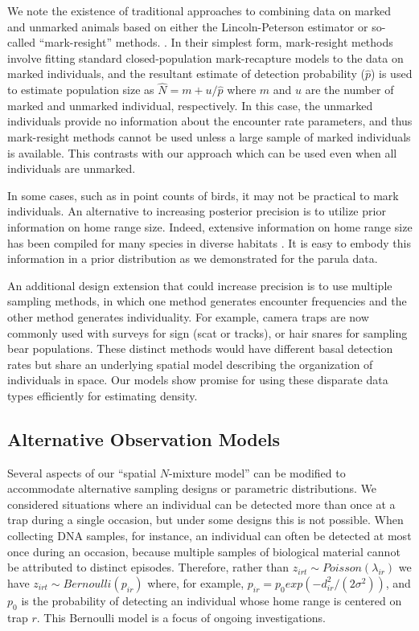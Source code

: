 We note the existence of traditional approaches to combining data on
marked and unmarked animals based on either the Lincoln-Peterson
estimator or so-called ``mark-resight'' methods.
\citep{bartmann_etal:1987, minta_mangel:1989, mcclintock_hoeting:2009}. In their
simplest form, mark-resight methods involve fitting standard
closed-population mark-recapture models to the data on marked
individuals, and the resultant estimate of detection probability
($\hat{p}$) is used to estimate population size as $\hat{N} = m +
u/\hat{p}$ where $m$ and $u$ are the number of
marked and unmarked individual, respectively. In this case,
the unmarked individuals provide no information about the
encounter rate parameters, and thus mark-resight methods cannot be
used unless a large sample of marked individuals is available. This
contrasts with our approach which can be used even when all
individuals are unmarked.

In some cases, such as in point counts of birds, it may not be
practical to mark individuals. An alternative to increasing posterior
precision is to utilize prior information on
home range size. Indeed, extensive information on home range size has
been compiled for many species in diverse habitats %
\citep[\emph{e.g.},][]{degraaf_yamasaki:2001}. It is
easy to embody this information in a prior distribution as we
demonstrated for the parula data.

An additional design extension that could increase precision is to use
multiple sampling methods, in which one method generates encounter
frequencies and the other method generates individuality.
For example, camera traps are now commonly used with surveys for
sign (scat or tracks), or hair snares for sampling bear populations.
These distinct methods would have different basal detection
rates but share an underlying spatial model describing the
organization of individuals in space.
Our models show promise for using
these disparate data types efficiently
for estimating density.




\subsection{Alternative Observation Models}
\label{ss:ext}

Several aspects of our ``spatial $N$-mixture model'' can be modified
to accommodate
alternative sampling designs or parametric distributions.
We considered situations where an individual can be detected more than
once at a trap during a single occasion, but under some designs this
is not possible. When collecting DNA samples, for instance, an
individual can often be detected at most once during an
occasion, because multiple samples of biological material cannot be
attributed
to distinct episodes. Therefore, rather than $z_{irt} \sim Poisson(\lambda_{ir})$
we have $z_{irt} \sim Bernoulli(p_{ir})$ where, for example,  $p_{ir} = p_0
exp(-d_{ir}^2/(2\sigma^2))$, and $p_0$ is the probability of
detecting an individual whose home range is centered on trap $r$. This
Bernoulli model is a focus of ongoing investigations.

